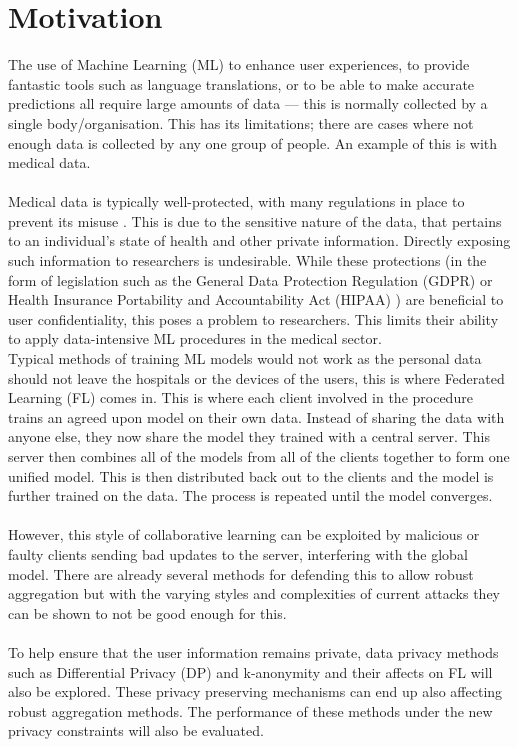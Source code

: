 \section{Motivation}
The use of Machine Learning (ML) to enhance user experiences, to provide fantastic tools such as language translations, or to be able to make accurate predictions all require large amounts of data --- this is normally collected by a single body/organisation. This has its limitations; there are cases where not enough data is collected by any one group of people. An example of this is with medical data.
\\ \\
Medical data is typically well-protected, with many regulations in place to prevent its misuse \cite{nhs_digital_data}.  This is due to the sensitive nature of the data, that pertains to an individual's state of health and other private information. Directly exposing such information to researchers is undesirable. While these protections (in the form of legislation such as the General Data Protection Regulation (GDPR) \cite{gdpr} or Health Insurance Portability and Accountability Act (HIPAA) \cite{hipaa}) are beneficial to user confidentiality, this poses a problem to researchers. This limits their ability to apply data-intensive ML procedures in the medical sector.\\

Typical methods of training ML models would not work as the personal data should not leave the hospitals or the devices of the users, this is where Federated Learning (FL) \cite{federated_comic} comes in. This is where each client involved in the procedure trains an agreed upon model on their own data. Instead of sharing the data with anyone else, they now share the model they trained with a central server. This server then combines all of the models from all of the clients together to form one unified model. This is then distributed back out to the clients and the model is further trained on the data. The process is repeated until the model converges.\\ \\
However, this style of collaborative learning can be exploited by malicious or faulty clients sending bad updates to the server, interfering with the global model. There are already several methods for defending this to allow robust aggregation but with the varying styles and complexities of current attacks they can be shown to not be good enough for this.\\ \\
To help ensure that the user information remains private, data privacy methods such as Differential Privacy (DP) and k-anonymity and their affects on FL will also be explored. These privacy preserving mechanisms can end up also affecting robust aggregation methods. The performance of these methods under the new privacy constraints will also be evaluated.


